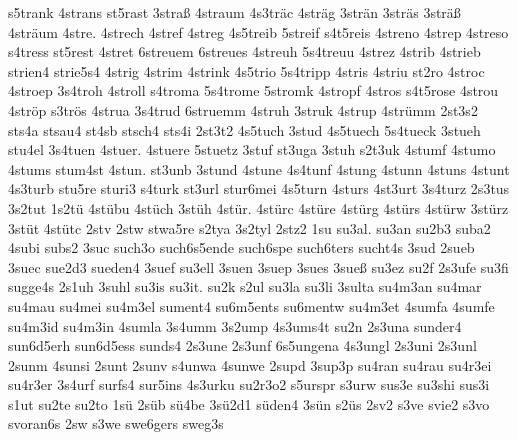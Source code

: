 {    s5trank
    4strans
    st5rast
    3straß
    4straum
    4s3träc
    4sträg
    3strän
    3sträs
    3sträß
    4sträum
    4stre.
    4strech
    4stref
    4streg
    4s5treib
    5streif
    s4t5reis
    4streno
    4strep
    4streso
    s4tress
    st5rest
    4stret
    6streuem
    6streues
    4streuh
    5s4treuu
    4strez
    4strib
    4strieb
    strien4
    strie5s4
    4strig
    4strim
    4strink
    4s5trio
    5s4tripp
    4stris
    4striu
    st2ro
    4stroc
    4stroep
    3s4troh
    4stroll
    s4troma
    5s4trome
    5stromk
    4stropf
    4stros
    s4t5rose
    4strou
    4ströp
    s3trös
    4strua
    3s4trud
    6struemm
    4struh
    3struk
    4strup
    4strümm
    2st3s2
    sts4a
    stsau4
    st4sb
    stsch4
    sts4i
    2st3t2
    4s5tuch
    3stud
    4s5tuech
    5s4tueck
    3stueh
    stu4el
    3s4tuen
    4stuer.
    4stuere
    5stuetz
    3stuf
    st3uga
    3stuh
    s2t3uk
    4stumf
    4stumo
    4stums
    stum4st
    4stun.
    st3unb
    3stund
    4stune
    4s4tunf
    4stung
    4stunn
    4stuns
    4stunt
    4s3turb
    stu5re
    sturi3
    s4turk
    st3url
    stur6mei
    4s5turn
    4sturs
    4st3urt
    3s4turz
    2s3tus
    3s2tut
    1s2tü
    4stübu
    4stüch
    3stüh
    4stür.
    4stürc
    4stüre
    4stürg
    4stürs
    4stürw
    3stürz
    3stüt
    4stütc
    2stv
    2stw
    stwa5re
    s2tya
    3s2tyl
    2stz2
    1su
    su3al.
    su3an
    su2b3
    suba2
    4subi
    subs2
    3suc
    such3o
    such6s5ende
    such6spe
    such6ters
    sucht4s
    3sud
    2sueb
    3suec
    sue2d3
    sueden4
    3suef
    su3ell
    3suen
    3suep
    3sues
    3sueß
    su3ez
    su2f
    2s3ufe
    su3fi
    sugge4s
    2s1uh
    3suhl
    su3is
    su3it.
    su2k
    s2ul
    su3la
    su3li
    3sulta
    su4m3an
    su4mar
    su4mau
    su4mei
    su4m3el
    sument4
    su6m5ents
    su6mentw
    su4m3et
    4sumfa
    4sumfe
    su4m3id
    su4m3in
    4sumla
    3s4umm
    3s2ump
    4s3ums4t
    su2n
    2s3una
    sunder4
    sun6d5erh
    sun6d5ess
    sunds4
    2s3une
    2s3unf
    6s5ungena
    4s3ungl
    2s3uni
    2s3unl
    2sunm
    4sunsi
    2sunt
    2sunv
    s4unwa
    4sunwe
    2supd
    3sup3p
    su4ran
    su4rau
    su4r3ei
    su4r3er
    3s4urf
    surfs4
    sur5ins
    4s3urku
    su2r3o2
    s5urspr
    s3urw
    sus3e
    su3shi
    sus3i
    s1ut
    su2te
    su2to
    1sü
    2süb
    sü4be
    3sü2d1
    süden4
    3sün
    s2üs
    2sv2
    s3ve
    svie2
    s3vo
    svoran6s
    2sw
    s3we
    swe6gers
    sweg3s
}
